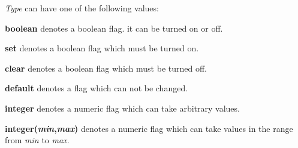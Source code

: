 {\em Type} can have one of the following values:

\begin{list}{}{\parsep=0pt\itemsep=0pt=9em\leftmargin=10em}
\item [\bf boolean] denotes a boolean flag. it can be turned on or off.
\item [\bf set] denotes a boolean flag which must be turned on.
\item [\bf clear] denotes a boolean flag which must be turned off.
\item [\bf default] denotes a flag which can not be changed.
\item [\bf integer] denotes a numeric flag which can take arbitrary values.
\item [\bf integer({\it min},{\it max})] denotes a numeric flag which can take
  values in the range from {\it min}\/ to {\it max}. 
\end{list}
